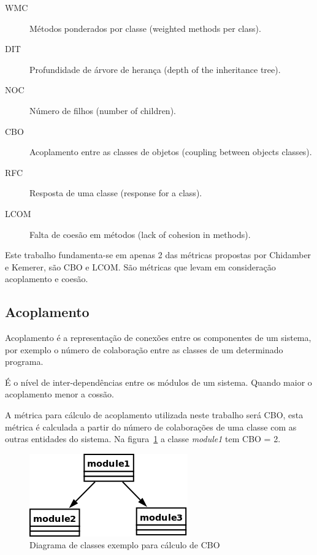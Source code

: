 \begin{description}
\item[WMC] Métodos ponderados por classe (weighted methods per class).
\item[DIT] Profundidade de árvore de herança (depth of the inheritance tree).
\item[NOC] Número de filhos (number of children).
\item[CBO] Acoplamento entre as classes de objetos (coupling between objects classes).
\item[RFC] Resposta de uma classe (response for a class).
\item[LCOM] Falta de coesão em métodos (lack of cohesion in methods).
\end{description}

Este trabalho fundamenta-se em apenas 2 das métricas propostas por Chidamber e
Kemerer, são CBO e LCOM. São métricas que levam em consideração acoplamento e
coesão.

\subsection{Acoplamento}

Acoplamento é a representação de conexões entre os componentes de um sistema,
por exemplo o número de colaboração entre as classes de um determinado
programa.

É o nível de inter-dependências entre os módulos de um sistema. Quando maior o
acoplamento menor a cossão.

A métrica para cálculo de acoplamento utilizada neste trabalho será CBO, esta
métrica é calculada a partir do número de colaborações de uma classe com as
outras entidades do sistema. Na figura~\ref{fig:exemplo-cbo} a classe
{\it module1} tem CBO = 2.

\begin{figure}[h]
\center
\includegraphics[scale=0.4]{imagens/exemplo-cbo}
\caption{Diagrama de classes exemplo para cálculo de CBO}
\label{fig:exemplo-cbo}
\end{figure}

